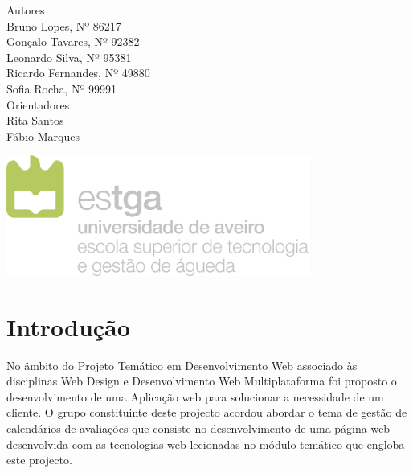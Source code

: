 \documentclass[11pt, twoside]{report}
\begin{document}
\begin{titlepage}
		
		
		\large
		Autores\\
		Bruno Lopes, Nº 86217 \\
		Gonçalo Tavares, Nº 92382  \\
		Leonardo Silva, Nº 95381 \\
		Ricardo Fernandes, Nº 49880  \\
		Sofia Rocha, Nº 99991 \\
		
		\vspace{1cm}
		Orientadores\\
		Rita Santos \\
		Fábio Marques\\
		\vspace{4cm}
		
		\centering
		\includegraphics[width=10cm]{image/AssB_vertical_cor}
		
	\end{titlepage}

	\newpage
	\setcounter{page}{1} %
	\tableofcontents %
	\thispagestyle{plain} %
	\thispagestyle{empty} %
	\newpage
	\listoftables %
	\newpage
	\listoffigures %
	
	\newpage
	
	\chapter{Introdução}
	
	
	No âmbito do Projeto Temático em Desenvolvimento Web associado às disciplinas Web Design e Desenvolvimento Web Multiplataforma foi proposto o desenvolvimento de uma Aplicação web para solucionar a necessidade de um cliente.
	O grupo constituinte deste projecto acordou abordar o tema de gestão de calendários de avaliações que consiste no desenvolvimento de uma página web desenvolvida com as tecnologias web lecionadas no módulo temático que engloba este projecto.
	
\end{document}
